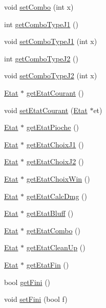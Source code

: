 \begin{DoxyCompactItemize}
void \hyperlink{class_jeu_a306805dc1c5101f60da1f47fbb6208a9}{set\-Combo} (int x)
\item 
int \hyperlink{class_jeu_a872cd7c640a9f400f9328d270df62949}{get\-Combo\-Type\-J1} ()
\item 
void \hyperlink{class_jeu_aaf27565623c1570e13daa67a65a999e9}{set\-Combo\-Type\-J1} (int x)
\item 
int \hyperlink{class_jeu_adb7a2e6e6bfe15ed1d720e884faca987}{get\-Combo\-Type\-J2} ()
\item 
void \hyperlink{class_jeu_a0d437ab069b7e94694fd3d567dd20e07}{set\-Combo\-Type\-J2} (int x)
\item 
\hyperlink{class_etat}{Etat} $\ast$ \hyperlink{class_jeu_a2f0816cea4f78387b7ec71aa5e1f1b14}{get\-Etat\-Courant} ()
\item 
void \hyperlink{class_jeu_afc4543470bc3a4f4dc84b0aad4295d2d}{set\-Etat\-Courant} (\hyperlink{class_etat}{Etat} $\ast$et)
\item 
\hyperlink{class_etat}{Etat} $\ast$ \hyperlink{class_jeu_ab70c1e2ede9fb55f99b433d650f05813}{get\-Etat\-Pioche} ()
\item 
\hyperlink{class_etat}{Etat} $\ast$ \hyperlink{class_jeu_aeaa2da8046a84766358d2c4422d093d1}{get\-Etat\-Choix\-J1} ()
\item 
\hyperlink{class_etat}{Etat} $\ast$ \hyperlink{class_jeu_a0e916d9f16d3e0eb073027e4d9d56ef0}{get\-Etat\-Choix\-J2} ()
\item 
\hyperlink{class_etat}{Etat} $\ast$ \hyperlink{class_jeu_afc4788d06bf24260783e70bce3455ca3}{get\-Etat\-Choix\-Win} ()
\item 
\hyperlink{class_etat}{Etat} $\ast$ \hyperlink{class_jeu_ae804c0bd49285e41a28299f41d5eaaba}{get\-Etat\-Calc\-Dmg} ()
\item 
\hyperlink{class_etat}{Etat} $\ast$ \hyperlink{class_jeu_a8f4efbf2847eafdd86cd178b8b17ba24}{get\-Etat\-Bluff} ()
\item 
\hyperlink{class_etat}{Etat} $\ast$ \hyperlink{class_jeu_a2d0de8666c9f02c0af9186ec7e51643e}{get\-Etat\-Combo} ()
\item 
\hyperlink{class_etat}{Etat} $\ast$ \hyperlink{class_jeu_aa9469a1ced32c683eae7bec567c170d3}{get\-Etat\-Clean\-Up} ()
\item 
\hyperlink{class_etat}{Etat} $\ast$ \hyperlink{class_jeu_a372dba23eee1d33eb24e8f2dc3c3b6f4}{get\-Etat\-Fin} ()
\item 
bool \hyperlink{class_jeu_a724b71e7405bf1f28142973e20902691}{get\-Fini} ()
\item 
void \hyperlink{class_jeu_a9f48a5d4b43894bc584972eadc7ec1a1}{set\-Fini} (bool f)

\end{DoxyCompactItemize}
